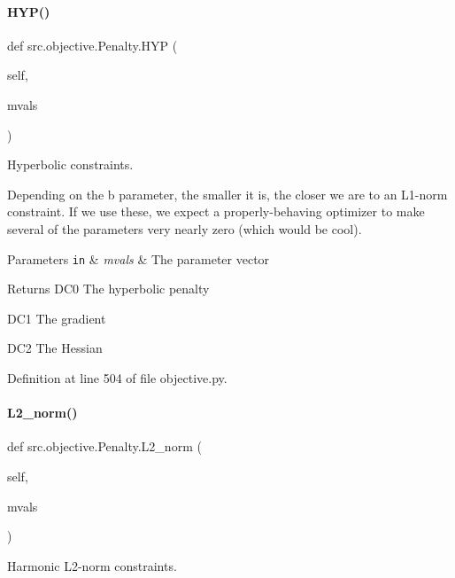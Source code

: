 \paragraph{\texorpdfstring{H\+Y\+P()}{HYP()}}
{\footnotesize\ttfamily def src.\+objective.\+Penalty.\+H\+YP (\begin{DoxyParamCaption}\item[{}]{self,  }\item[{}]{mvals }\end{DoxyParamCaption})}



Hyperbolic constraints. 

Depending on the \textquotesingle{}b\textquotesingle{} parameter, the smaller it is, the closer we are to an L1-\/norm constraint. If we use these, we expect a properly-\/behaving optimizer to make several of the parameters very nearly zero (which would be cool).


\begin{DoxyParams}[1]{Parameters}
\mbox{\tt in}  & {\em mvals} & The parameter vector \\
\hline
\end{DoxyParams}
\begin{DoxyReturn}{Returns}
D\+C0 The hyperbolic penalty 

D\+C1 The gradient 

D\+C2 The Hessian 
\end{DoxyReturn}


Definition at line 504 of file objective.\+py.

\mbox{\label{classsrc_1_1objective_1_1Penalty_ac462ae51ca2ed44c587b155a8b8f4a9a}} 
\paragraph{\texorpdfstring{L2\+\_\+norm()}{L2\_norm()}}
{\footnotesize\ttfamily def src.\+objective.\+Penalty.\+L2\+\_\+norm (\begin{DoxyParamCaption}\item[{}]{self,  }\item[{}]{mvals }\end{DoxyParamCaption})}



Harmonic L2-\/norm constraints. 


